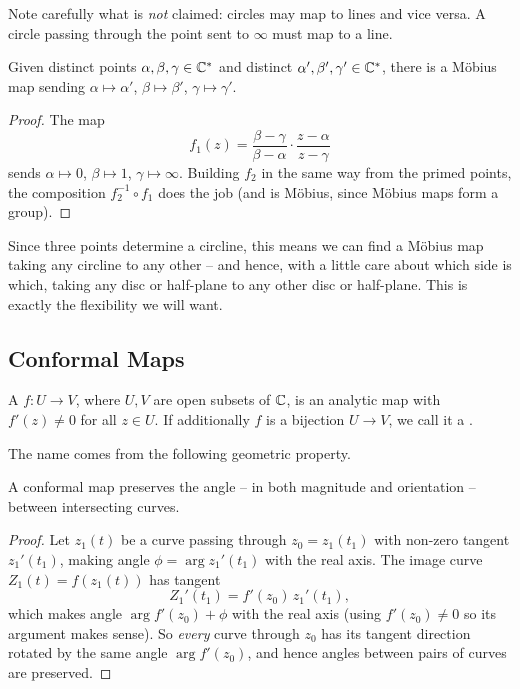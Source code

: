 \documentclass[a4paper]{scrartcl}
\begin{document}
Note carefully what is \emph{not} claimed: circles may map to lines and vice versa. A circle passing through the point sent to $\infty$ must map to a line.

\begin{proposition}
	Given distinct points $\alpha, \beta, \gamma \in \mathbb{C}^*$ and distinct $\alpha', \beta', \gamma' \in \mathbb{C}^*$, there is a M\"obius map sending $\alpha \mapsto \alpha'$, $\beta \mapsto \beta'$, $\gamma \mapsto \gamma'$.
\end{proposition}
\begin{proof}
	The map
	$$
	f_1(z) = \frac{\beta - \gamma}{\beta - \alpha} \cdot \frac{z - \alpha}{z - \gamma}
	$$
	sends $\alpha \mapsto 0$, $\beta \mapsto 1$, $\gamma \mapsto \infty$. Building $f_2$ in the same way from the primed points, the composition $f_2^{-1} \circ f_1$ does the job (and is M\"obius, since M\"obius maps form a group).
\end{proof}

Since three points determine a circline, this means we can find a M\"obius map taking any circline to any other -- and hence, with a little care about which side is which, taking any disc or half-plane to any other disc or half-plane. This is exactly the flexibility we will want.

\subsection{Conformal Maps}

\begin{definition}
	A  $f : U \to V$, where $U, V$ are open subsets of $\mathbb{C}$, is an analytic map with $f'(z) \neq 0$ for all $z \in U$. If additionally $f$ is a bijection $U \to V$, we call it a .
\end{definition}

The name comes from the following geometric property.

\begin{proposition}
	A conformal map preserves the angle -- in both magnitude and orientation -- between intersecting curves.
\end{proposition}
\begin{proof}
	Let $z_1(t)$ be a curve passing through $z_0 = z_1(t_1)$ with non-zero tangent $z_1'(t_1)$, making angle $\phi = \arg z_1'(t_1)$ with the real axis. The image curve $Z_1(t) = f(z_1(t))$ has tangent
	$$
	Z_1'(t_1) = f'(z_0) \, z_1'(t_1),
	$$
	which makes angle $\arg f'(z_0) + \phi$ with the real axis (using $f'(z_0) \neq 0$ so its argument makes sense). So \emph{every} curve through $z_0$ has its tangent direction rotated by the same angle $\arg f'(z_0)$, and hence angles between pairs of curves are preserved.
\end{proof}
\end{document}
